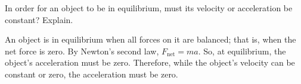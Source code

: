\documentclass[../main-physics-problems.tex]{subfiles}
\begin{document}
\begin{questions}

\question
In order for an object to be in equilibrium, must its velocity or acceleration be constant? Explain.

\begin{solution}
An object is in equilibrium when all forces on it are balanced; that is, when the net force is zero. By Newton's second law, $F_\mathrm{net} = ma$. So, at equilibrium, the object's acceleration must be zero. Therefore, while the object's velocity can be constant or zero, the acceleration must be zero.
\end{solution}


\end{questions}
\end{document}
